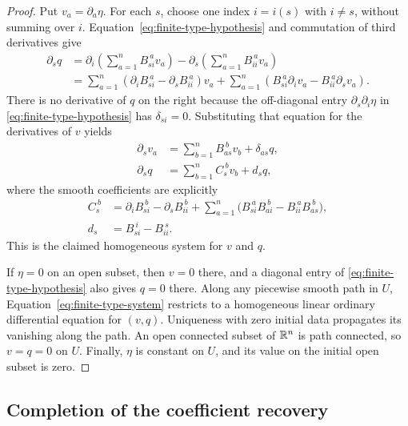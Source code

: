 \begin{proof}
Put $v_a=\partial_a\eta$.  For each $s$, choose one index $i=i(s)$ with
$i\ne s$, without summing over $i$.  Equation~\eqref{eq:finite-type-hypothesis}
and commutation of third derivatives give
\begin{align*}
 \partial_s q
 &=\partial_i\left(\sum_{a=1}^n B_{si}^{\ a}v_a\right)
       -\partial_s\left(\sum_{a=1}^n B_{ii}^{\ a}v_a\right)\\
 &=\sum_{a=1}^n
       (\partial_i B_{si}^{\ a}-\partial_s B_{ii}^{\ a})v_a
    +\sum_{a=1}^n
       (B_{si}^{\ a}\partial_i v_a-B_{ii}^{\ a}\partial_s v_a).
\end{align*}
There is no derivative of $q$ on the right because the off-diagonal
entry $\partial_s\partial_i\eta$ in
\eqref{eq:finite-type-hypothesis} has $\delta_{si}=0$.
Substituting that equation for the derivatives of $v$ yields
\begin{equation}\label{eq:finite-type-system}
 \begin{aligned}
  \partial_s v_a&=\sum_{b=1}^n B_{as}^{\ b}v_b+\delta_{as}q,\\
  \partial_s q&=\sum_{b=1}^n C_s^{\ b}v_b+d_s q,
 \end{aligned}
\end{equation}
where the smooth coefficients are explicitly
\begin{equation}\label{eq:finite-type-coefficients}
 \begin{aligned}
 C_s^{\ b}
   &=\partial_i B_{si}^{\ b}-\partial_s B_{ii}^{\ b}
     +\sum_{a=1}^n
       \bigl(B_{si}^{\ a}B_{ai}^{\ b}-B_{ii}^{\ a}B_{as}^{\ b}\bigr),\\
 d_s&=B_{si}^{\ i}-B_{ii}^{\ s}.
 \end{aligned}
\end{equation}
This is the claimed homogeneous system for $v$ and $q$.

If $\eta=0$ on an open subset, then $v=0$ there, and a diagonal entry of
\eqref{eq:finite-type-hypothesis} also gives $q=0$ there.  Along any
piecewise smooth path in $U$, Equation~\eqref{eq:finite-type-system}
restricts to a homogeneous linear ordinary differential equation for
$(v,q)$.  Uniqueness with zero initial data propagates its vanishing along
the path.  An open connected subset of $\mathbb R^n$ is path connected, so
$v=q=0$ on $U$.  Finally, $\eta$ is constant on $U$, and its value on the
initial open subset is zero.
\end{proof}

\subsection{Completion of the coefficient recovery}

